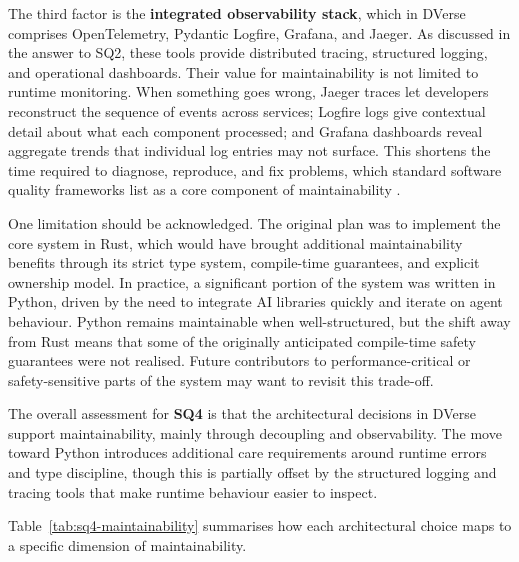 \documentclass[11pt]{article}
\begin{document}
The third factor is the \textbf{integrated observability stack}, which in DVerse comprises OpenTelemetry, Pydantic Logfire, Grafana, and Jaeger. As discussed in the answer to SQ2, these tools provide distributed tracing, structured logging, and operational dashboards. Their value for maintainability is not limited to runtime monitoring. When something goes wrong, Jaeger traces let developers reconstruct the sequence of events across services; Logfire logs give contextual detail about what each component processed; and Grafana dashboards reveal aggregate trends that individual log entries may not surface. This shortens the time required to diagnose, reproduce, and fix problems, which standard software quality frameworks list as a core component of maintainability \cite{iso25010,bass2012}.

One limitation should be acknowledged. The original plan was to implement the core system in Rust, which would have brought additional maintainability benefits through its strict type system, compile-time guarantees, and explicit ownership model. In practice, a significant portion of the system was written in Python, driven by the need to integrate AI libraries quickly and iterate on agent behaviour. Python remains maintainable when well-structured, but the shift away from Rust means that some of the originally anticipated compile-time safety guarantees were not realised. Future contributors to performance-critical or safety-sensitive parts of the system may want to revisit this trade-off.

The overall assessment for \textbf{SQ4} is that the architectural decisions in DVerse support maintainability, mainly through decoupling and observability. The move toward Python introduces additional care requirements around runtime errors and type discipline, though this is partially offset by the structured logging and tracing tools that make runtime behaviour easier to inspect.

Table~\ref{tab:sq4-maintainability} summarises how each architectural choice maps to a specific dimension of maintainability.
\end{document}
